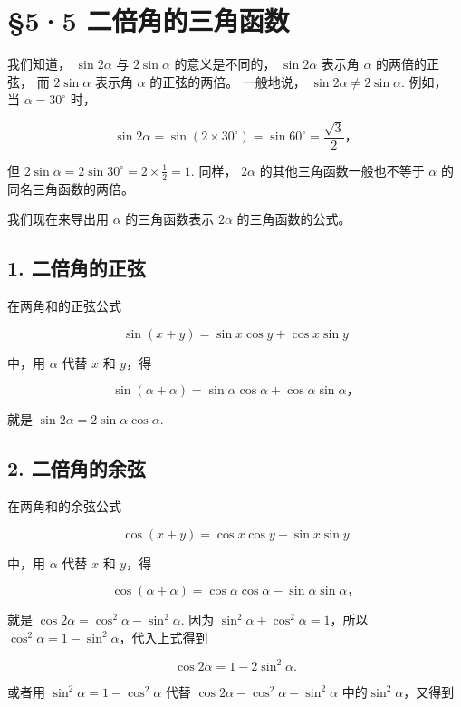 \section{§5·5 二倍角的三角函数}

我们知道， \(\sin 2\alpha\) 与 \(2\sin \alpha\) 的意义是不同的，
\(\sin 2\alpha\) 表示角 \(\alpha\) 的两倍的正弦， 而 \(2\sin \alpha\)
表示角 \(\alpha\) 的正弦的两倍。 一般地说，
\(\sin 2\alpha \neq 2\sin \alpha\). 例如， 当 \(\alpha = 30^{\circ}\)
时，

\[
\sin 2 \alpha = \sin (2 \times 30 ^{\circ}) = \sin 60 ^{\circ} = \frac {\sqrt {3}}{2}\text{，}
\]

但 \(2\sin \alpha = 2\sin 30^{\circ} = 2\times \frac{1}{2} = 1.\) 同样，
\(2\alpha\) 的其他三角函数一般也不等于 \(\alpha\) 的同名三角函数的两倍。

我们现在来导出用 \(\alpha\) 的三角函数表示 \(2\alpha\)
的三角函数的公式。

\subsection{1. 二倍角的正弦}

在两角和的正弦公式

\[
\sin (x + y) = \sin x \cos y + \cos x \sin y
\]

中，用 \(\alpha\) 代替 \(x\) 和 \(y\)，得

\[
\sin (\alpha + \alpha) = \sin \alpha \cos \alpha + \cos \alpha \sin \alpha \text{，}
\]

就是 \(\sin 2\alpha = 2\sin \alpha \cos \alpha.\)

\subsection{2. 二倍角的余弦}

在两角和的余弦公式

\[
\cos (x + y) = \cos x \cos y - \sin x \sin y
\]

中，用 \(\alpha\) 代替 \(x\) 和 \(y\)，得

\[
\cos (\alpha + \alpha) = \cos \alpha \cos \alpha - \sin \alpha \sin \alpha \text{，}
\]

就是 \(\cos 2\alpha = \cos^2\alpha -\sin^2\alpha .\) 因为
\(\sin^2\alpha +\cos^2\alpha = 1\)，所以
\(\cos^2\alpha = 1 - \sin^2\alpha\)，代入上式得到

\[
\cos 2 \alpha = 1 - 2 \sin^ {2} \alpha .
\]

或者用 \(\sin^2\alpha = 1 - \cos^2\alpha\) 代替
\(\cos 2\alpha -\cos^2\alpha -\sin^2\alpha\)
中的\(\sin^2\alpha\)，又得到

